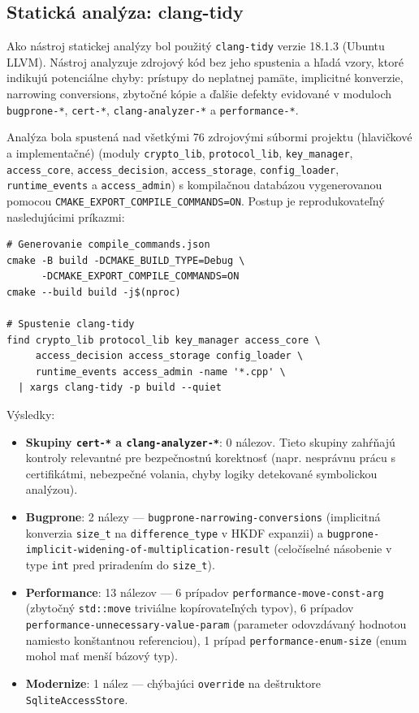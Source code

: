 \documentclass[journal,a4paper,onecolumn]{IEEEtran}
\begin{document}
\subsection{Statická analýza: clang-tidy}

Ako nástroj statickej analýzy bol použitý \texttt{clang-tidy} verzie 18.1.3 (Ubuntu LLVM). Nástroj analyzuje zdrojový kód bez jeho spustenia a hľadá vzory, ktoré indikujú potenciálne chyby: prístupy do neplatnej pamäte, implicitné konverzie, narrowing conversions, zbytočné kópie a ďalšie defekty evidované v moduloch \texttt{bugprone-*}, \texttt{cert-*}, \texttt{clang-analyzer-*} a \texttt{performance-*}.

Analýza bola spustená nad všetkými 76 zdrojovými súbormi projektu (hlavičkové a implementačné) (moduly \texttt{crypto\_lib}, \texttt{protocol\_lib}, \texttt{key\_manager}, \texttt{access\_core}, \texttt{access\_decision}, \texttt{access\_storage}, \texttt{config\_loader}, \texttt{runtime\_events} a \texttt{access\_admin}) s kompilačnou databázou vygenerovanou pomocou \texttt{CMAKE\_EXPORT\_COMPILE\_COMMANDS=ON}. Postup je reprodukovateľný nasledujúcimi príkazmi:

\begin{verbatim}
# Generovanie compile_commands.json
cmake -B build -DCMAKE_BUILD_TYPE=Debug \
      -DCMAKE_EXPORT_COMPILE_COMMANDS=ON
cmake --build build -j$(nproc)

# Spustenie clang-tidy
find crypto_lib protocol_lib key_manager access_core \
     access_decision access_storage config_loader \
     runtime_events access_admin -name '*.cpp' \
  | xargs clang-tidy -p build --quiet
\end{verbatim}

Výsledky:

\begin{itemize}
\item \textbf{Skupiny \texttt{cert-*} a \texttt{clang-analyzer-*}}: 0 nálezov. Tieto skupiny zahŕňajú kontroly relevantné pre bezpečnostnú korektnosť (napr. nesprávnu prácu s certifikátmi, nebezpečné volania, chyby logiky detekované symbolickou analýzou).
\item \textbf{Bugprone}: 2 nálezy --- \texttt{bugprone-narrowing-conversions} (implicitná konverzia \texttt{size\_t} na \texttt{difference\_type} v HKDF expanzii) a \texttt{bugprone-implicit-widening-of-multiplication-result} (celočíselné násobenie v type \texttt{int} pred priradením do \texttt{size\_t}).
\item \textbf{Performance}: 13 nálezov --- 6 prípadov \texttt{performance-move-const-arg} (zbytočný \texttt{std::move} triviálne kopírovateľných typov), 6 prípadov \texttt{performance-unnecessary-value-param} (parameter odovzdávaný hodnotou namiesto konštantnou referenciou), 1 prípad \texttt{performance-enum-size} (enum mohol mať menší bázový typ).
\item \textbf{Modernize}: 1 nález --- chýbajúci \texttt{override} na deštruktore \texttt{SqliteAccessStore}.
\end{itemize}
\end{document}
